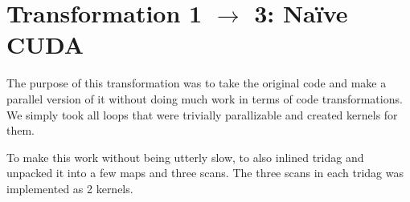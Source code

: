 \section{Transformation 1 $\rightarrow$ 3: Naïve CUDA}

The purpose of this transformation was to take the original code and
make a parallel version of it without doing much work in terms of code
transformations. We simply took all loops that were trivially
parallizable and created kernels for them.

To make this work without being utterly slow, to also inlined tridag
and unpacked it into a few maps and three scans. The three scans in
each tridag was implemented as 2 kernels.
